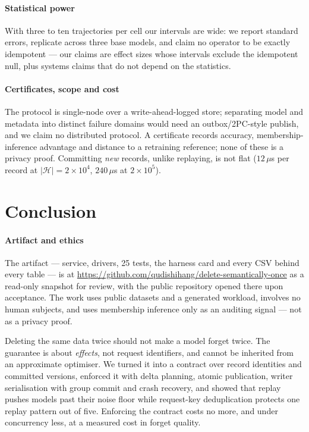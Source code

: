 \documentclass[conference]{IEEEtran}
\newcommand{\Hset}{\mathcal{H}}
\newcommand{\artifacturl}{https://github.com/qudishihang/delete-semantically-once}
\begin{document}
\paragraph{Statistical power}
With three to ten trajectories per cell our intervals are wide: we report standard errors,
replicate across three base models, and claim no operator to be exactly idempotent --- our
claims are effect sizes whose intervals exclude the idempotent null, plus systems claims that do
not depend on the statistics.

\paragraph{Certificates, scope and cost}
The protocol is single-node over a write-ahead-logged store; separating model and metadata into
distinct failure domains would need an outbox/2PC-style publish, and we claim no distributed
protocol.  A certificate records accuracy, membership-inference advantage and distance to a
retraining reference; none of these is a privacy proof.  Committing \emph{new} records, unlike
replaying, is not flat ($12\,\mu$s per record at $|\Hset|=2\times10^4$, $240\,\mu$s at
$2\times10^5$).

\section{Conclusion}
\label{sec:conclusion}

\paragraph{Artifact and ethics}
The artifact --- service, drivers, 25 tests, the harness card and every CSV behind every
table --- is at \url{\artifacturl} as a read-only snapshot for review, with the public
repository opened there upon acceptance.  The work uses public datasets and a generated
workload, involves no human subjects, and uses membership inference only as an auditing
signal --- not as a privacy proof.

Deleting the same data twice should not make a model forget twice.  The guarantee is about
\emph{effects}, not request identifiers, and cannot be inherited from an approximate
optimiser.  We turned it into a contract over record identities and committed versions,
enforced it with delta planning, atomic publication, writer serialisation with group commit and
crash recovery, and showed that replay pushes models past their noise floor while request-key
deduplication protects one replay pattern out of five.  Enforcing the contract costs no more,
and under concurrency less, at a measured cost in forget quality.
\end{document}
